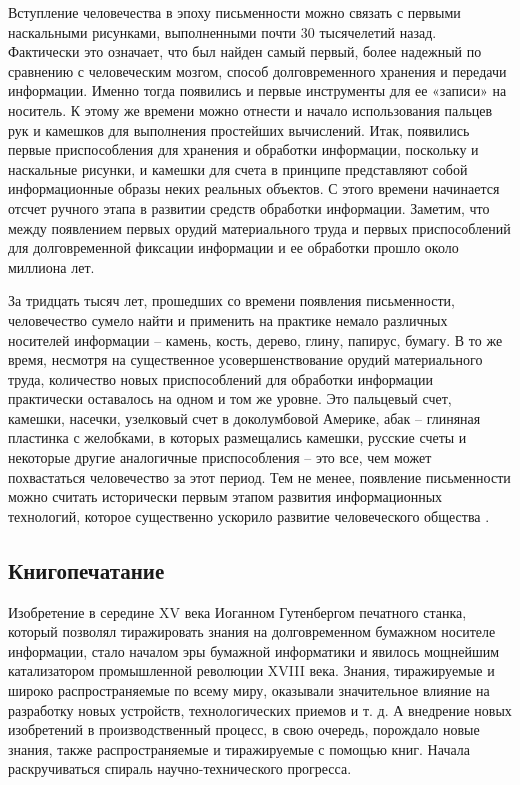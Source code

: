 Вступление человечества в эпоху письменности можно связать с первыми наскальными рисунками, выполненными почти 30 тысячелетий назад. Фактически это означает, что был найден самый первый, более надежный по сравнению с человеческим мозгом, способ долговременного хранения и передачи информации. Именно тогда появились и первые инструменты для ее «записи» на носитель. К этому же времени можно отнести и начало использования пальцев рук и камешков для выполнения простейших вычислений. Итак, появились первые приспособления для хранения и обработки информации, поскольку и наскальные рисунки, и камешки для счета в принципе представляют собой информационные образы неких реальных объектов. С этого времени начинается отсчет ручного этапа в развитии средств обработки информации. Заметим, что между появлением первых орудий материального труда и первых приспособлений для долговременной фиксации информации и ее обработки прошло около миллиона лет.

За тридцать тысяч лет, прошедших со времени появления письменности, человечество сумело найти и применить на практике немало различных носителей информации – камень, кость, дерево, глину, папирус, бумагу. В то же время, несмотря на существенное усовершенствование орудий материального труда, количество новых приспособлений для обработки информации практически оставалось на одном и том же уровне. Это пальцевый счет, камешки, насечки, узелковый счет в доколумбовой Америке, абак – глиняная пластинка с желобками, в которых размещались камешки, русские счеты и некоторые другие аналогичные приспособления – это все, чем может похвастаться человечество за этот период. Тем не менее, появление письменности можно считать исторически первым этапом развития информационных технологий, которое существенно ускорило развитие человеческого общества \cite{bib103}.

\subsection{Книгопечатание} \label{subsect1_1_3}

Изобретение в середине XV века Иоганном Гутенбергом печатного станка, который позволял тиражировать знания на долговременном бумажном носителе информации, стало началом эры бумажной информатики и явилось мощнейшим катализатором промышленной революции XVIII века. Знания, тиражируемые и широко распространяемые по всему миру, оказывали значительное влияние на разработку новых устройств, технологических приемов и т. д. А внедрение новых изобретений в производственный процесс, в свою очередь, порождало новые знания, также распространяемые и тиражируемые с помощью книг. Начала раскручиваться спираль научно-технического прогресса.

